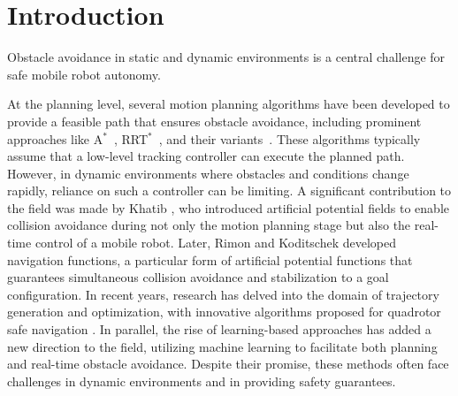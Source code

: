 \section{Introduction}
\label{sec: intro}


Obstacle avoidance in static and dynamic environments is a central challenge for safe mobile robot autonomy. 

At the planning level, several motion planning algorithms have been developed to provide a feasible path that ensures obstacle avoidance, including prominent approaches like A$^*$~\cite{A_star_planning}, RRT$^*$~\cite{RRT_star}, and their variants~\cite{informed_rrt_star, neural_rrt_star}. These algorithms typically assume that a low-level tracking controller can execute the planned path. However, in dynamic environments where obstacles and conditions change rapidly, reliance on such a controller can be limiting. A significant contribution to the field was made by Khatib \cite{potential-field}, who introduced artificial potential fields to enable collision avoidance during not only the motion planning stage but also the real-time control of a mobile robot. Later, Rimon and Koditschek \cite{navigation-function} developed navigation functions, a particular form of artificial potential functions that guarantees simultaneous collision avoidance and stabilization to a goal configuration.
In recent years, research has delved into the domain of trajectory generation and optimization, with innovative algorithms proposed for quadrotor safe navigation \cite{mellinger_snap_2011, zhou2019robust, tordesillas2019faster}. In parallel, the rise of learning-based approaches \cite{michels2005high, pfeiffer2018reinforced, loquercio2021learning} has added a new direction to the field, utilizing machine learning to facilitate both planning and real-time obstacle avoidance. Despite their promise, these methods often face challenges in dynamic environments and in providing safety guarantees.


